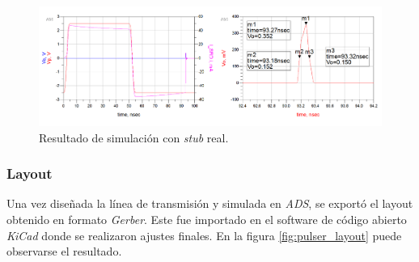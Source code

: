 \begin{figure}[tbp]
    \centering
    \includegraphics[width=\textwidth]{images/real_stub_simulation_result.png}
    \caption{Resultado de simulación con \textit{stub} real.}
    \label{fig:real_stub_simulation_result}
\end{figure}

\subsubsection{Layout}

Una vez diseñada la línea de transmisión y simulada en \textit{ADS}, se exportó
el layout obtenido en formato \textit{Gerber}. Este fue importado en el software
de código abierto \textit{KiCad} donde se realizaron ajustes finales. En la
figura \ref{fig:pulser_layout} puede observarse el resultado.

